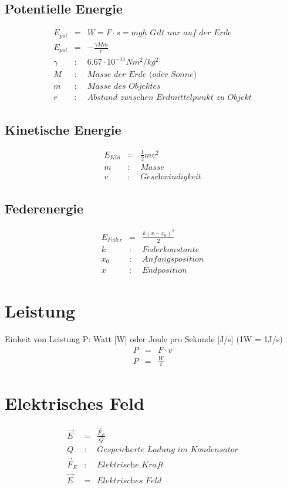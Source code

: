 \documentclass[11pt]{article}
\begin{document}
\subsection{Potentielle Energie}
\begin{eqnarray*}
E_{pot} &=& W = F\cdot s = mgh \textit{  Gilt nur auf der Erde}\\
E_{pot} &=& -\frac{\gamma Mm}{r}\\
\gamma &:& 6.67 \cdot 10^{-11} Nm^2/kg^2\\
M &:& \textit{Masse der Erde (oder Sonne)}\\
m &:& \textit{Masse des Objektes}\\
r &:& \textit{Abstand zwischen Erdmittelpunkt zu Objekt}
\end{eqnarray*}

\subsection{Kinetische Energie}
\begin{eqnarray*}
E_{Kin} &=& \frac{1}{2}mv^2\\
m &:& \textit{Masse}\\
v &:& \textit{Geschwindigkeit}
\end{eqnarray*}

\subsection{Federenergie}
\begin{eqnarray*}
E_{Feder} &=& \frac{k(x-x_0)^2}{2}\\
k &:& \textit{Federkonstante}\\
x_0 &:& \textit{Anfangsposition}\\
x &:& \textit{Endposition}
\end{eqnarray*}

\section{Leistung}
Einheit von Leistung P: Watt [W] oder Joule pro Sekunde [J/s] (1W = 1J/s)
\begin{eqnarray*}
P &=& F \cdot v\\
P &=& \frac{W}{t}
\end{eqnarray*}


\section{Elektrisches Feld}
\begin{eqnarray*}
\overrightarrow{E}&=&\frac{\overrightarrow{F}_E}{Q}\\
Q &:& \textit{Gespeicherte Ladung im Kondensator}\\
\overrightarrow{F}_E &:& \textit{Elektrische Kraft}\\
\overrightarrow{E} &=& \textit{Elektrisches Feld}
\end{eqnarray*}
\end{document}
